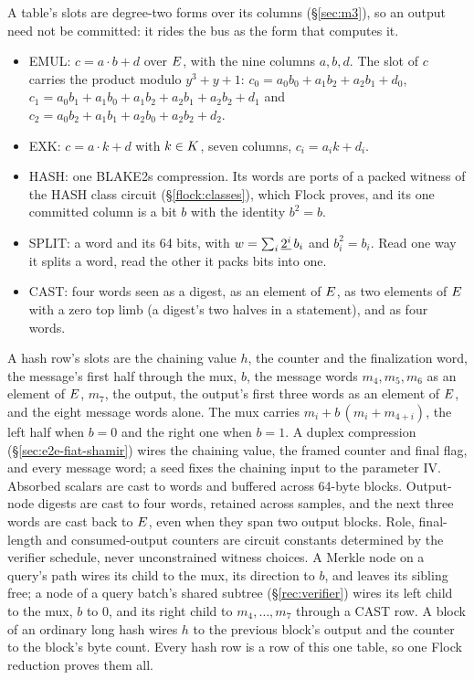 A table's slots are degree-two forms over its columns (\S\ref{sec:m3}), so an output need not be committed: it rides the bus as the form that computes it.
\begin{itemize}[itemsep=1pt,topsep=3pt]
\item \textsf{EMUL}: $c=a\cdot b+d$ over $E$, with the nine columns $a,b,d$. The slot of $c$ carries the product modulo $y^3+y+1$: $c_0=a_0b_0+a_1b_2+a_2b_1+d_0$, $c_1=a_0b_1+a_1b_0+a_1b_2+a_2b_1+a_2b_2+d_1$ and $c_2=a_0b_2+a_1b_1+a_2b_0+a_2b_2+d_2$.
\item \textsf{EXK}: $c=a\cdot k+d$ with $k\in K$, seven columns, $c_i=a_ik+d_i$.
\item \textsf{HASH}: one BLAKE2s compression. Its words are ports of a packed witness of the \textsf{HASH} class circuit (\S\ref{flock:classes}), which Flock proves, and its one committed column is a bit $b$ with the identity $b^2=b$.
\item \textsf{SPLIT}: a word and its 64 bits, with $w=\sum_i\underline{2^i}\,b_i$ and $b_i^2=b_i$. Read one way it splits a word, read the other it packs bits into one.
\item \textsf{CAST}: four words seen as a digest, as an element of $E$, as two elements of $E$ with a zero top limb (a digest's two halves in a statement), and as four words.
\end{itemize}
A hash row's slots are the chaining value $h$, the counter and the finalization word, the message's first half through the mux, $b$, the message words $m_4,m_5,m_6$ as an element of $E$, $m_7$, the output, the output's first three words as an element of $E$, and the eight message words alone. The mux carries $m_i+b\,(m_i+m_{4+i})$, the left half when $b=0$ and the right one when $b=1$. A duplex compression (\S\ref{sec:e2e-fiat-shamir}) wires the chaining value, the framed counter and final flag, and every message word; a seed fixes the chaining input to the parameter IV. Absorbed scalars are cast to words and buffered across 64-byte blocks. Output-node digests are cast to four words, retained across samples, and the next three words are cast back to $E$, even when they span two output blocks. Role, final-length and consumed-output counters are circuit constants determined by the verifier schedule, never unconstrained witness choices. A Merkle node on a query's path wires its child to the mux, its direction to $b$, and leaves its sibling free; a node of a query batch's shared subtree (\S\ref{rec:verifier}) wires its left child to the mux, $b$ to $0$, and its right child to $m_4,\dots,m_7$ through a \textsf{CAST} row. A block of an ordinary long hash wires $h$ to the previous block's output and the counter to the block's byte count. Every hash row is a row of this one table, so one Flock reduction proves them all.

